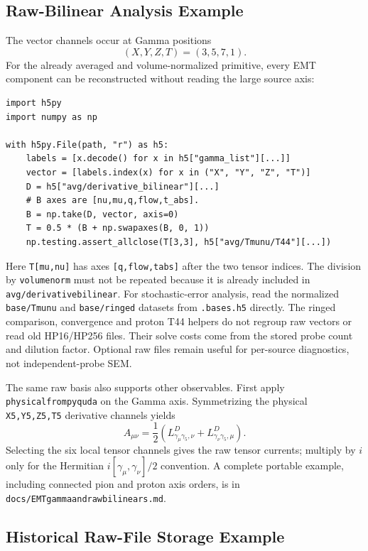 \documentclass[11pt,a4paper]{article}
\newcommand{\code}[1]{\texttt{\begingroup\def\_{\textunderscore\allowbreak}#1\endgroup}}
\begin{document}
\subsection{Raw-Bilinear Analysis Example}

The vector channels occur at Gamma positions
\begin{equation}
  (X,Y,Z,T)=(3,5,7,1).
\end{equation}
For the already averaged and volume-normalized primitive, every EMT component
can be reconstructed without reading the large source axis:
\begin{verbatim}
import h5py
import numpy as np

with h5py.File(path, "r") as h5:
    labels = [x.decode() for x in h5["gamma_list"][...]]
    vector = [labels.index(x) for x in ("X", "Y", "Z", "T")]
    D = h5["avg/derivative_bilinear"][...]
    # B axes are [nu,mu,q,flow,t_abs].
    B = np.take(D, vector, axis=0)
    T = 0.5 * (B + np.swapaxes(B, 0, 1))
    np.testing.assert_allclose(T[3,3], h5["avg/Tmunu/T44"][...])
\end{verbatim}
Here \code{T[mu,nu]} has axes \code{[q,flow,t\_abs]} after the two tensor
indices.  The division by \code{volume\_norm} must not be repeated because it
is already included in \code{avg/derivative\_bilinear}. For stochastic-error
analysis, read the normalized \code{base/Tmunu} and \code{base/ringed} datasets
from \code{.bases.h5} directly. The ringed comparison, convergence and proton
T44 helpers do not regroup raw vectors or read old HP16/HP256 files. Their
solve costs come from the stored probe count and dilution factor. Optional raw
files remain useful for per-source diagnostics, not independent-probe SEM.

The same raw basis also supports other observables.  First apply
\code{physical\_from\_pyquda} on the Gamma axis.  Symmetrizing the physical
\code{X5,Y5,Z5,T5} derivative channels yields
\begin{equation}
A_{\mu\nu}=\frac12\left(
L^D_{\gamma_\mu\gamma_5,\nu}
+L^D_{\gamma_\nu\gamma_5,\mu}\right).
\end{equation}
Selecting the six local tensor channels gives the raw tensor currents; multiply
by $i$ only for the Hermitian $i[\gamma_\mu,\gamma_\nu]/2$ convention.  A
complete portable example, including connected pion and proton axis orders, is
in \code{docs/EMT\_gamma\_and\_raw\_bilinears.md}.

\subsection{Historical Raw-File Storage Example}
\end{document}

